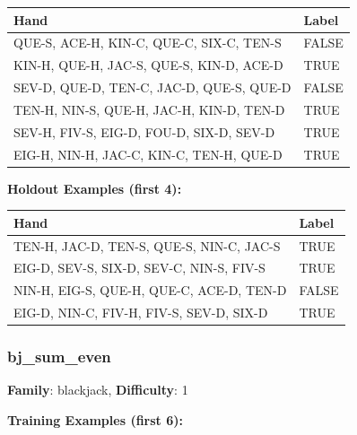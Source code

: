 \documentclass[10pt,a4paper]{article}
\begin{document}
\begin{small}
\begin{tabular}{p{8cm}l}
\toprule
Hand & Label \\
\midrule
QUE-S, ACE-H, KIN-C, QUE-C, SIX-C, TEN-S & \textcolor{negative}{FALSE} \\
KIN-H, QUE-H, JAC-S, QUE-S, KIN-D, ACE-D & \textcolor{positive}{TRUE} \\
SEV-D, QUE-D, TEN-C, JAC-D, QUE-S, QUE-D & \textcolor{negative}{FALSE} \\
TEN-H, NIN-S, QUE-H, JAC-H, KIN-D, TEN-D & \textcolor{positive}{TRUE} \\
SEV-H, FIV-S, EIG-D, FOU-D, SIX-D, SEV-D & \textcolor{positive}{TRUE} \\
EIG-H, NIN-H, JAC-C, KIN-C, TEN-H, QUE-D & \textcolor{positive}{TRUE} \\
\bottomrule
\end{tabular}
\end{small}

\textbf{Holdout Examples (first 4):}

\begin{small}
\begin{tabular}{p{8cm}l}
\toprule
Hand & Label \\
\midrule
TEN-H, JAC-D, TEN-S, QUE-S, NIN-C, JAC-S & \textcolor{positive}{TRUE} \\
EIG-D, SEV-S, SIX-D, SEV-C, NIN-S, FIV-S & \textcolor{positive}{TRUE} \\
NIN-H, EIG-S, QUE-H, QUE-C, ACE-D, TEN-D & \textcolor{negative}{FALSE} \\
EIG-D, NIN-C, FIV-H, FIV-S, SEV-D, SIX-D & \textcolor{positive}{TRUE} \\
\bottomrule
\end{tabular}
\end{small}

\vspace{0.5cm}

\subsubsection{bj\_sum\_even}

\textbf{Family}: blackjack, \textbf{Difficulty}: 1

\textbf{Training Examples (first 6):}
\end{document}
